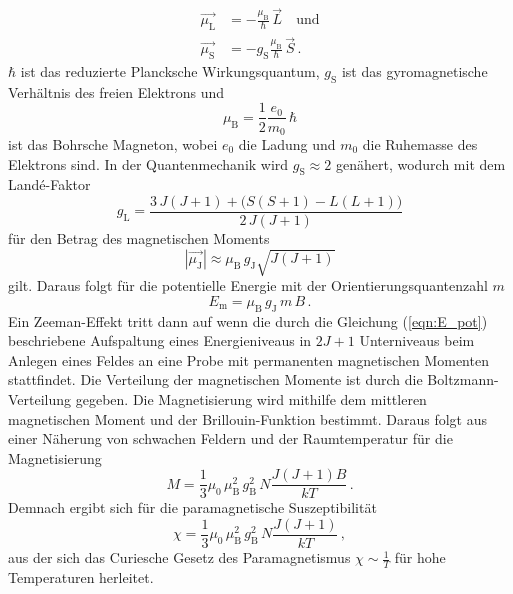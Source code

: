 \begin{align}
    \vec{\mu _{\text{L}}} &= - \frac{\mu_{\text{B}}}{\hbar}\,\vec{L}\quad\text{und} \label{eqn:magnetischerMommentDrehimpuls} \\
    \vec{\mu _ {\text{S}}} &= -g_{\text{S}}\frac{\mu_{\text{B}}}{\hbar}\,\vec{S}\,. \label{eqn:magnetischerMomentSpin}
\end{align}
$\hbar$ ist das reduzierte Plancksche Wirkungsquantum, $g_{\text{S}}$ ist das gyromagnetische Verhältnis des freien Elektrons und 
\begin{equation}
    \mu _{\text{B}} = \frac{1}{2} \frac{e_0}{m_0}\,\hbar
    \label{eqn:BohrscheMagneton}
\end{equation}
ist das Bohrsche Magneton, wobei $e_0$ die Ladung und $m_0$ die Ruhemasse des Elektrons sind. 
In der Quantenmechanik wird $g_{\text{S}} \approx 2$ genähert, wodurch mit dem Landé-Faktor
\begin{equation}
    g_{\text{L}} = \frac{3\,J \left(J+1\right) + \big(S\left(S +1\right) -L\left(L+1\right)\big)}{2\,J\left(J+1\right)} 
    \label{eqn:LandeFaktor}
\end{equation}
für den Betrag des magnetischen Moments 
\begin{equation}
    \left|\vec{\mu_{\text{J}}}\right| \approx \mu_{\text{B}}\,g_{\text{J}}\sqrt{J\left(J+1\right)}
    \label{eqn:magnetischerMoment}
\end{equation}
gilt. Daraus folgt für die potentielle Energie mit der Orientierungsquantenzahl $m$
\begin{equation}
    E_{\text{m}} = \mu_{\text{B}}\,g_{\text{J}}\, m\, B\,. 
    \label{eqn:E_pot}
\end{equation}
Ein Zeeman-Effekt tritt dann auf wenn die durch die Gleichung (\ref{eqn:E_pot}) beschriebene Aufspaltung eines Energieniveaus
in $2J+1$ Unterniveaus beim Anlegen eines Feldes an eine Probe mit permanenten magnetischen Momenten stattfindet.
Die Verteilung der magnetischen Momente ist durch die Boltzmann-Verteilung gegeben. Die Magnetisierung wird mithilfe dem mittleren magnetischen 
Moment und der Brillouin-Funktion bestimmt. Daraus folgt aus einer Näherung von schwachen Feldern und der Raumtemperatur für die Magnetisierung
\begin{equation}
    M = \frac{1}{3}\mu _0\,\mu_{\text{B}}^2\,g_{\text{B}}^2\,N \frac{J(J+1)B}{kT}\,.
    \label{eqn:Magnetisierung_Naeherung}
\end{equation}
Demnach ergibt sich für die paramagnetische Suszeptibilität 
\begin{equation}
    \chi = \frac{1}{3}\mu _0\,\mu_{\text{B}}^2\,g_{\text{B}}^2\,N \frac{J(J+1)}{kT}\,,
    \label{eqn:paramagnetische_Suszeptibilität}
\end{equation}
aus der sich das Curiesche Gesetz des Paramagnetismus $\chi \sim \frac{1}{T}$ für hohe Temperaturen herleitet.

